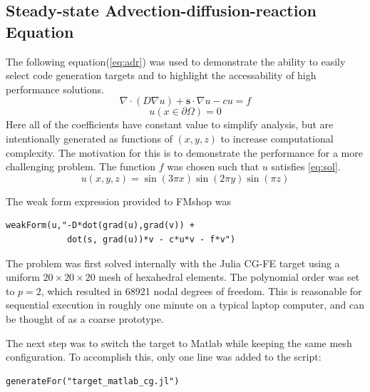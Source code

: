 \documentclass[twoside,leqno,twocolumn]{article}
\begin{document}
\subsection{Steady-state Advection-diffusion-reaction Equation}
The following equation(\ref{eq:adr}) was used to demonstrate the ability to easily select code generation targets and to highlight the accessability of high performance solutions. 
\begin{equation}
\label{eq:adr}
\nabla \cdot (D\nabla u) + \textbf{s} \cdot \nabla u - c u = f
\end{equation}
\[
u(x\in \partial \Omega) = 0
\]
Here all of the coefficients have constant value to simplify analysis, but are intentionally generated as functions of $(x,y,z)$ to increase computational complexity. The motivation for this is to demonstrate the performance for a more challenging problem. The function $f$ was chosen such that $u$ satisfies \ref{eq:sol}.
\begin{equation}
\label{eq:sol}
u(x,y,z) = \sin(3\pi x) \sin(2\pi y) \sin(\pi z)
\end{equation}

The weak form expression provided to FMshop was
\begin{verbatim}
weakForm(u,"-D*dot(grad(u),grad(v)) + 
            dot(s, grad(u))*v - c*u*v - f*v")
\end{verbatim}

The problem was first solved internally with the Julia CG-FE target using a uniform $20\times 20\times 20$ mesh of hexahedral elements. The polynomial order was set to $p=2$, which resulted in 68921 nodal degrees of freedom. This is reasonable for sequential execution in roughly one minute on a typical laptop computer, and can be thought of as a coarse prototype.

The next step was to switch the target to Matlab while keeping the same mesh configuration. To accomplish this, only one line was added to the script: \begin{verbatim}
generateFor("target_matlab_cg.jl")
\end{verbatim}
 
\end{document}
